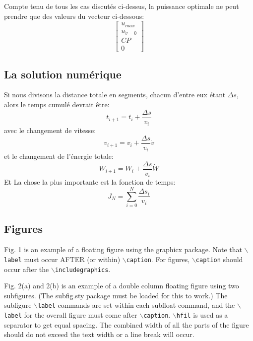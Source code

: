 \documentclass[lettersize,journal]{IEEEtran}
\begin{document}
Compte tenu de tous les cas discutés ci-dessus, la puissance optimale ne peut prendre que des valeurs du vecteur ci-dessous:
\begin{equation}
    \begin{bmatrix}
	u_{max}  \\
    u_{\dot{v}=0} \\
   CP\\
    0
\end{bmatrix}
\end{equation}

\subsection{La solution numérique}
Si nous divisons la distance totale en segments, chacun d’entre eux étant $\Delta s$, alors le temps cumulé devrait être:
\begin{equation}
    t_{i+1} = t_{i}+\frac{\Delta s}{v_{i}}
\end{equation}
avec le changement de vitesse:
\begin{equation}
    v_{i+1} = v_{i}+\frac{\Delta s}{v_{i}}\dot{v}
\end{equation}
et le changement de l'énergie totale:
\begin{equation}
    W_{i+1} = W_{i}+\frac{\Delta s}{v_{i}}\dot{W}
\end{equation}
Et La chose la plus importante est la fonction de temps:
\begin{equation}
    J_{N} = \sum\limits_{i=0}^{N}\frac{\Delta s_{i}}{v_{i}}
\end{equation}

\clearpage





\subsection{Figures}
Fig. 1 is an example of a floating figure using the graphicx package.
 Note that $\backslash${\tt{label}} must occur AFTER (or within) $\backslash${\tt{caption}}.
 For figures, $\backslash${\tt{caption}} should occur after the $\backslash${\tt{includegraphics}}.


Fig. 2(a) and 2(b) is an example of a double column floating figure using two subfigures.
 (The subfig.sty package must be loaded for this to work.)
 The subfigure $\backslash${\tt{label}} commands are set within each subfloat command,
 and the $\backslash${\tt{label}} for the overall figure must come after $\backslash${\tt{caption}}.
 $\backslash${\tt{hfil}} is used as a separator to get equal spacing.
 The combined width of all the parts of the figure should do not exceed the text width or a line break will occur.
%
\end{document}
